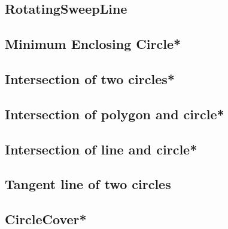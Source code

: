 \subsection{RotatingSweepLine}

\subsection{Minimum Enclosing Circle*} %

\subsection{Intersection of two circles*} %

\subsection{Intersection of polygon and circle*} %

\subsection{Intersection of line and circle*} %

\subsection{Tangent line of two circles}

\subsection{CircleCover*} %

% 
% 
% 
% 
